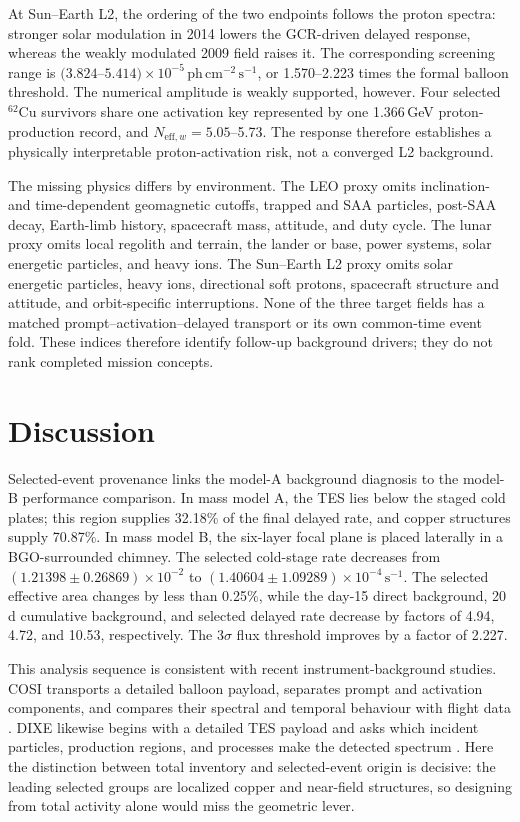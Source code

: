 \documentclass[11pt]{article}
\newcommand{\phcms}{\ensuremath{\,\mathrm{ph\,cm^{-2}\,s^{-1}}}}
\newcommand{\cps}{\ensuremath{\,\mathrm{s^{-1}}}}
\begin{document}
At Sun--Earth L2, the ordering of the two endpoints follows the proton spectra:
stronger solar modulation in 2014 lowers the GCR-driven delayed response,
whereas the weakly modulated 2009 field raises it. The corresponding screening
range is $(3.824$--$5.414)\times10^{-5}\phcms$, or 1.570--2.223 times the
formal balloon threshold. The numerical amplitude is weakly supported,
however. Four selected $^{62}$Cu survivors share one activation key represented
by one 1.366\,GeV proton-production record, and
$N_{\mathrm{eff},w}=5.05$--5.73. The response therefore establishes a
physically interpretable proton-activation risk, not a converged L2
background.

The missing physics differs by environment. The LEO proxy omits
inclination- and time-dependent geomagnetic cutoffs, trapped and SAA particles,
post-SAA decay, Earth-limb history, spacecraft mass, attitude, and duty cycle.
The lunar proxy omits local regolith and terrain, the lander or base, power
systems, solar energetic particles, and heavy ions. The Sun--Earth L2 proxy
omits solar energetic particles, heavy ions, directional soft protons,
spacecraft structure and attitude, and orbit-specific interruptions. None of
the three target fields has a matched prompt--activation--delayed transport or
its own common-time event fold. These indices therefore identify follow-up
background drivers; they do not rank completed mission concepts.

\FloatBarrier

\section{Discussion}
\label{sec:discussion}

Selected-event provenance links the model-A background diagnosis to the
model-B performance comparison. In mass model A, the TES lies below the staged cold
plates; this region supplies 32.18\% of the final delayed rate, and copper structures
supply 70.87\%. In mass model B, the six-layer focal plane is placed laterally in a
BGO-surrounded chimney. The selected cold-stage rate decreases from
$(1.21398\pm0.26869)\times10^{-2}$ to
$(1.40604\pm1.09289)\times10^{-4}\cps$. The selected effective area changes by less than
0.25\%, while the day-15 direct background, 20 d cumulative background, and
selected delayed rate decrease by factors of 4.94, 4.72, and 10.53,
respectively. The $3\sigma$ flux threshold improves by a factor of
2.227.

This analysis sequence is consistent with recent instrument-background studies.
COSI transports a detailed balloon payload, separates prompt and activation
components, and compares their spectral and temporal behaviour with flight data
\cite{Gallego2025Balloon}. DIXE likewise begins with a detailed TES payload and
asks which incident particles, production regions, and processes make the
detected spectrum \cite{Tian2026DIXE}. Here the distinction between total
inventory and selected-event origin is decisive: the leading selected groups are
localized copper and near-field structures, so designing from total activity
alone would miss the geometric lever.
\end{document}
